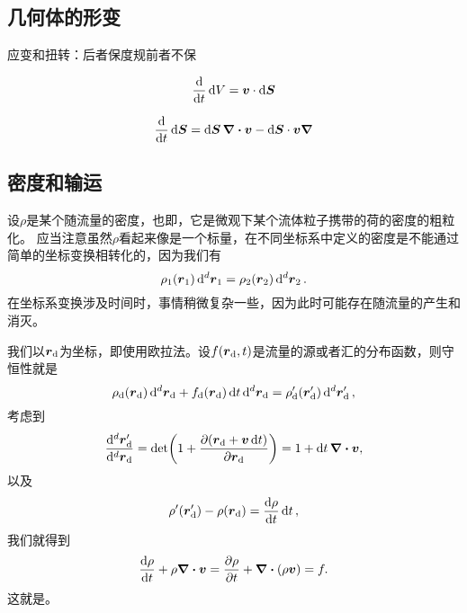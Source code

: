 \subsection{几何体的形变}

应变和扭转：后者保度规前者不保

\begin{equation}
    \dv{t} \dd{V} = \vb*{v} \cdot \dd{\vb*{S}}
    \label{eq:volumn-time-change}
\end{equation}

\begin{equation}
    \dv{t} \dd{\vb*{S}} = \dd{\vb*{S}} \div{\vb*{v}} - \dd{\vb*{S}} \cdot \vb*{v} \grad
\end{equation}

\subsection{密度和输运}

设$\rho$是某个随流量的密度，也即，它是微观下某个流体粒子携带的荷的密度的粗粒化。
应当注意虽然$\rho$看起来像是一个标量，在不同坐标系中定义的密度是不能通过简单的坐标变换相转化的，因为我们有
\[
    \rho_1(\vb*{r}_1) \dd[d]{\vb*{r}_1} = \rho_2(\vb*{r}_2) \dd[d]{\vb*{r}_2}.
\]
在坐标系变换涉及时间时，事情稍微复杂一些，因为此时可能存在随流量的产生和消灭。

我们以$\vb*{r}_\text{d}$为坐标，即使用欧拉法。设$f(\vb*{r}_\text{d}, t)$是流量的源或者汇的分布函数，则守恒性就是
\[
    \rho_\text{d}(\vb*{r}_\text{d}) \dd[d]{\vb*{r}_\text{d}} + f_\text{d} (\vb*{r}_\text{d}) \dd{t} \dd[d]{\vb*{r}_\text{d}} = \rho'_\text{d} (\vb*{r}_\text{d}') \dd[d]{\vb*{r}'_\text{d}},
\]
考虑到
\[
    \frac{\dd[d]{\vb*{r}_\text{d}'}}{\dd[d]{\vb*{r}_\text{d}}} = \det( 1 + \pdv{(\vb*{r}_\text{d} + \vb*{v} \dd{t})}{\vb*{r}_\text{d}} ) = 1 + \dd{t} \div{\vb*{v}},
\]
以及
\[
    \rho'(\vb*{r}_\text{d}') - \rho(\vb*{r}_\text{d}) = \dv{\rho}{t} \dd{t},
\]
我们就得到
\begin{equation}
    \dv{\rho}{t} + \rho \div{\vb*{v}} = \pdv{\rho}{t} + \div{(\rho \vb*{v})} = f.
    \label{eq:transportation-eq}
\end{equation}
这就是。

